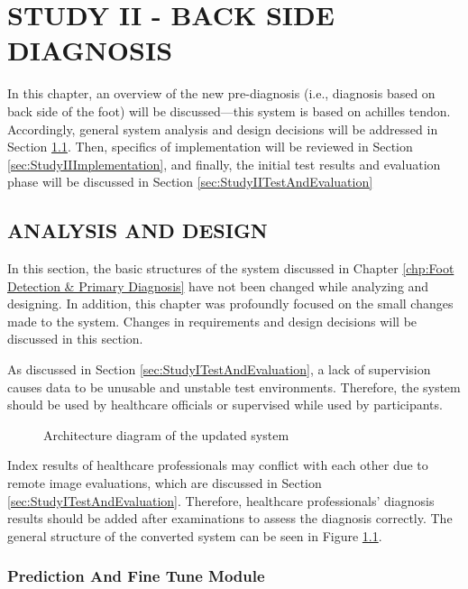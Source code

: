 \chapter{STUDY II - BACK SIDE DIAGNOSIS}\label{chp:Back Side Diagnosis}

In this chapter, an overview of the new pre-diagnosis (i.e., diagnosis based on back side of the foot) will be discussed—this system is based on achilles tendon. Accordingly, general system analysis and design decisions will be addressed in Section \ref{sec:StudyIIAnalysisAndDesign}. Then, specifics of implementation will be reviewed in Section \ref{sec:StudyIIImplementation}, and finally, the initial test results and evaluation phase will be discussed in Section \ref{sec:StudyIITestAndEvaluation}

\section{ANALYSIS AND DESIGN} \label{sec:StudyIIAnalysisAndDesign}

In this section, the basic structures of the system discussed in Chapter \ref{chp:Foot Detection & Primary Diagnosis} have not been changed while analyzing and designing. In addition, this chapter was profoundly focused on the small changes made to the system. Changes in requirements and design decisions will be discussed in this section.

As discussed in Section \ref{sec:StudyITestAndEvaluation}, a lack of supervision causes data to be unusable and unstable test environments. Therefore, the system should be used by healthcare officials or supervised while used by participants.

\begin{figure}[htbp]
\centering
{}
\caption{Architecture diagram of the updated system}
\label{fig:GeneralArchitectureDiagramPartI}
\end{figure}

Index results of healthcare professionals may conflict with each other due to remote image evaluations, which are discussed in Section \ref{sec:StudyITestAndEvaluation}. Therefore, healthcare professionals’ diagnosis results should be added after examinations to assess the diagnosis correctly. The general structure of the converted system can be seen in Figure \ref{fig:GeneralArchitectureDiagramPartI}.

\subsection{ Prediction And Fine Tune Module }

